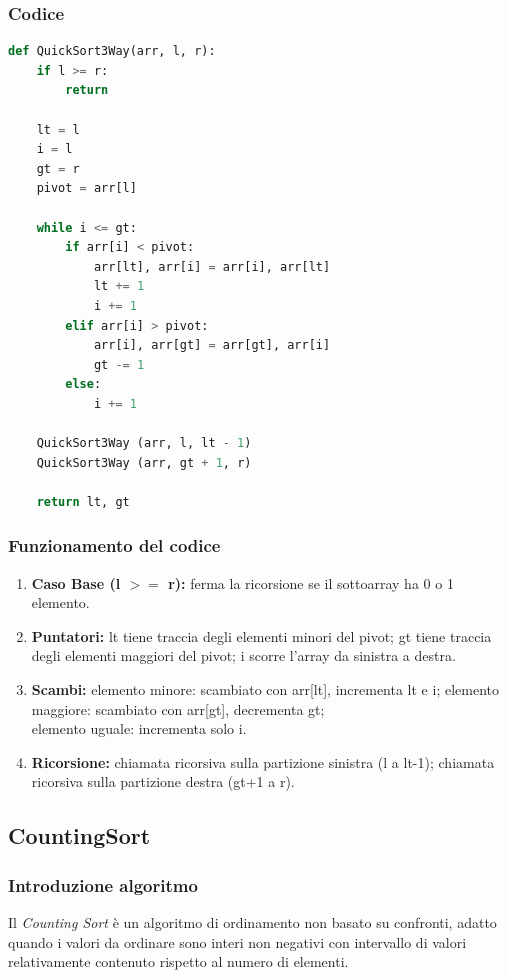 \documentclass[a4paper, 11pt]{article}
\begin{document}
\subsubsection{Codice}
\begin{lstlisting}[style=mycodestyle, language=Python]
    def QuickSort3Way(arr, l, r):
    if l >= r:
        return

    lt = l
    i = l
    gt = r
    pivot = arr[l]

    while i <= gt:
        if arr[i] < pivot:
            arr[lt], arr[i] = arr[i], arr[lt]
            lt += 1
            i += 1
        elif arr[i] > pivot:
            arr[i], arr[gt] = arr[gt], arr[i]
            gt -= 1
        else:
            i += 1

    QuickSort3Way (arr, l, lt - 1)
    QuickSort3Way (arr, gt + 1, r)

    return lt, gt
\end{lstlisting}

\subsubsection*{Funzionamento del codice}

\begin{enumerate}
  \item \textbf{Caso Base (l $>=$ r):} ferma la ricorsione se il sottoarray ha 0 o 1 elemento.

  \item \textbf{Puntatori:} lt tiene traccia degli elementi minori del pivot; gt tiene traccia degli elementi maggiori del pivot; i scorre l'array da sinistra a destra.

  \item \textbf{Scambi:} elemento minore: scambiato con arr[lt], incrementa lt e i; elemento maggiore: scambiato con arr[gt], decrementa gt; \\ elemento uguale: incrementa solo i.

  \item \textbf{Ricorsione:} chiamata ricorsiva sulla partizione sinistra (l a lt-1); chiamata ricorsiva sulla partizione destra (gt+1 a r).
\end{enumerate}

\subsection{CountingSort}

\subsubsection*{Introduzione algoritmo}
Il \emph{Counting Sort} è un algoritmo di ordinamento non basato su confronti, adatto quando i valori da ordinare sono interi non negativi con intervallo di valori relativamente contenuto rispetto al numero di elementi. \\
\end{document}
